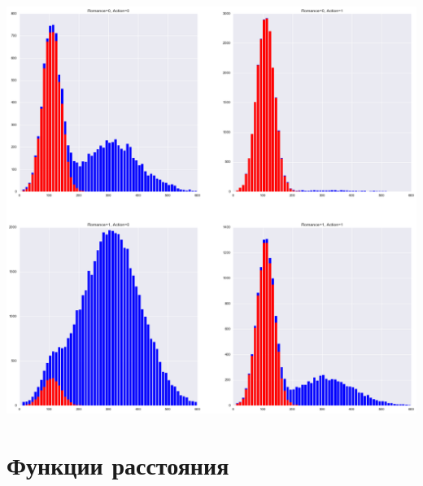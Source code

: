\documentclass[aspectratio=169]{beamer}
\begin{document}
\begin{frame}{}

\begin{center}
\includegraphics[height=0.8\textheight]{images/movies_res.png}
\end{center}

\end{frame}


\section{Функции расстояния}

\end{document}
